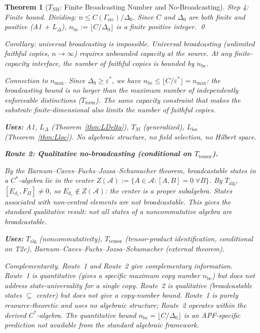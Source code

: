 \documentclass[11pt,a4paper]{article}
\newtheorem{theorem}{Theorem}[section]
\theoremstyle{definition}
\newcommand{\eps}{\varepsilon}
\begin{document}
\begin{theorem}[$T_{\mathrm{NB}}$: Finite Broadcasting Number and No-Broadcasting]
\textit{Step 4: Finite bound.}  Dividing: $n \le C(\Gamma_{\mathrm{src}})/\Delta_0$.  Since $C$ and $\Delta_0$ are both finite and positive (A1 + $L_\Delta$), $n_{\mathrm{bc}} := \lfloor C/\Delta_0 \rfloor$ is a finite positive integer.  \qed

\smallskip\noindent\textit{Corollary: universal broadcasting is impossible.}  Universal broadcasting (unlimited faithful copies, $n \to \infty$) requires unbounded capacity at the source.  At any finite-capacity interface, the number of faithful copies is bounded by $n_{\mathrm{bc}}$.

\smallskip\noindent\textit{Connection to $n_{\max}$.}  Since $\Delta_0 \ge \eps^*$, we have $n_{\mathrm{bc}} \le \lfloor C/\eps^* \rfloor = n_{\max}$: the broadcasting bound is no larger than the maximum number of independently enforceable distinctions ($T_{\mathrm{form}}$).  The same capacity constraint that makes the substrate finite-dimensional also limits the number of faithful copies.

\smallskip\noindent\textbf{Uses:} A1, $L_\Delta$ (Theorem~\ref{thm:LDelta}), $T_M$ (generalized), $L_{\mathrm{loc}}$ (Theorem~\ref{thm:Lloc}).  No algebraic structure, no field selection, no Hilbert space.

\medskip\noindent\textbf{Route 2: Qualitative no-broadcasting (conditional on $T_{\mathrm{tensor}}$).}

By the Barnum--Caves--Fuchs--Jozsa--Schumacher theorem, broadcastable states in a $C^*$-algebra lie in the center $Z(\mathcal{A}) := \{A \in \mathcal{A} : [A, B] = 0\;\forall B\}$.  By $T_{\mathrm{alg}}$, $[E_{d_1}, F_\Pi] \ne 0$, so $E_{d_1} \notin Z(\mathcal{A})$: the center is a proper subalgebra.  States associated with non-central elements are not broadcastable.  This gives the standard qualitative result: not all states of a noncommutative algebra are broadcastable.

\smallskip\noindent\textbf{Uses:} $T_{\mathrm{alg}}$ (noncommutativity), $T_{\mathrm{tensor}}$ (tensor-product identification, conditional on T2c), Barnum--Caves--Fuchs--Jozsa--Schumacher (external theorem).

\medskip\noindent\textit{Complementarity.}  Route~1 and Route~2 give complementary information.  Route~1 is quantitative (gives a specific maximum copy number $n_{\mathrm{bc}}$) but does not address state-universality for a single copy.  Route~2 is qualitative (broadcastable states $\subseteq$ center) but does not give a copy-number bound.  Route~1 is purely resource-theoretic and uses no algebraic structure; Route~2 operates within the derived $C^*$-algebra.  The quantitative bound $n_{\mathrm{bc}} = \lfloor C/\Delta_0\rfloor$ is an APF-specific prediction not available from the standard algebraic framework.
\end{theorem}
\end{document}
